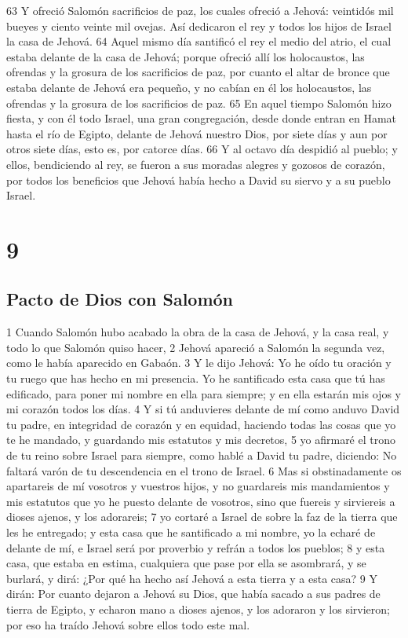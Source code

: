 63 Y ofreció Salomón sacrificios de paz, los cuales ofreció a Jehová: veintidós mil bueyes y ciento veinte mil ovejas. Así dedicaron el rey y todos los hijos de Israel la casa de Jehová.
64 Aquel mismo día santificó el rey el medio del atrio, el cual estaba delante de la casa de Jehová; porque ofreció allí los holocaustos, las ofrendas y la grosura de los sacrificios de paz, por cuanto el altar de bronce que estaba delante de Jehová era pequeño, y no cabían en él los holocaustos, las ofrendas y la grosura de los sacrificios de paz.
65 En aquel tiempo Salomón hizo fiesta, y con él todo Israel, una gran congregación, desde donde entran en Hamat hasta el río de Egipto, delante de Jehová nuestro Dios, por siete días y aun por otros siete días, esto es, por catorce días.
66 Y al octavo día despidió al pueblo; y ellos, bendiciendo al rey, se fueron a sus moradas alegres y gozosos de corazón, por todos los beneficios que Jehová había hecho a David su siervo y a su pueblo Israel.

\chapter{9}

\section*{Pacto de Dios con Salomón}

 

1 Cuando Salomón hubo acabado la obra de la casa de Jehová, y la casa real, y todo lo que Salomón quiso hacer,
2 Jehová apareció a Salomón la segunda vez, como le había aparecido en Gabaón. 
3 Y le dijo Jehová: Yo he oído tu oración y tu ruego que has hecho en mi presencia. Yo he santificado esta casa que tú has edificado, para poner mi nombre en ella para siempre; y en ella estarán mis ojos y mi corazón todos los días.
4 Y si tú anduvieres delante de mí como anduvo David tu padre, en integridad de corazón y en equidad, haciendo todas las cosas que yo te he mandado, y guardando mis estatutos y mis decretos,
5 yo afirmaré el trono de tu reino sobre Israel para siempre, como hablé a David tu padre, diciendo: No faltará varón de tu descendencia en el trono de Israel. 
6 Mas si obstinadamente os apartareis de mí vosotros y vuestros hijos, y no guardareis mis mandamientos y mis estatutos que yo he puesto delante de vosotros, sino que fuereis y sirviereis a dioses ajenos, y los adorareis;
7 yo cortaré a Israel de sobre la faz de la tierra que les he entregado; y esta casa que he santificado a mi nombre, yo la echaré de delante de mí, e Israel será por proverbio y refrán a todos los pueblos;
8 y esta casa, que estaba en estima, cualquiera que pase por ella se asombrará, y se burlará, y dirá: ¿Por qué ha hecho así Jehová a esta tierra y a esta casa? 
9 Y dirán: Por cuanto dejaron a Jehová su Dios, que había sacado a sus padres de tierra de Egipto, y echaron mano a dioses ajenos, y los adoraron y los sirvieron; por eso ha traído Jehová sobre ellos todo este mal.
